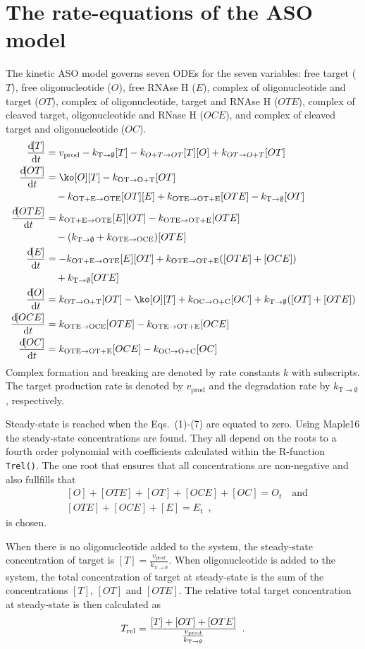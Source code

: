 \documentclass[a4paper,11pt]{article}
\newcommand{\kmo}{k_{\mathrm{OT \to O+T}}}
\newcommand{\kmt}{k_{\mathrm{OTE \to OT+E}}}
\newcommand{\kt}{k_{\mathrm{OT+E \to OTE}}}
\newcommand{\kE}{k_{\mathrm{OTE \to OCE}}}
\newcommand{\kD}{k_{\mathrm{OC \to O+C}}}
\newcommand{\vp}{v_{\mathrm{prod}}}
\newcommand{\vd}{k_{\mathrm{T \to \emptyset}}}
\newcommand{\Trel}{T_{\rm{rel}}}
\begin{document}
\section{The rate-equations of the ASO model}
The kinetic ASO model governs seven ODEs for the seven variables: free target ($T$), free oligonucleotide ($O$), free RNAse H ($E$), complex of oligonucleotide and target ($OT$), complex of oligonucleotide, target and RNAse H  ($OTE$), complex of cleaved target, oligonucleotide and RNase H ($OCE$), and complex of cleaved target and oligonucleotide  ($OC$).
\begin{align}
\frac{\dif [T]}{\dif t} &= \vp - \vd [T]-k_{O+T \to OT} [T] [O] +k_{OT\to O+T } [OT] \\
\frac{\dif [OT]}{\dif t} &= \ko[O][T]-\kmo[OT] \nonumber \\
	& \quad -\kt[OT][E]+\kmt [OTE]-\vd[OT] \\
\frac{\dif [OTE]}{\dif t} &= \kt[E][OT]-\kmt[OTE] \nonumber \\
	& \quad -(\vd+\kE)[OTE]\\
\frac{\dif [E]}{\dif t} &= -\kt[E][OT]+\kmt([OTE]+[OCE]) \nonumber \\
	& \quad+\vd[OTE]\\
\frac{\dif [O]}{\dif t}&= \kmo [OT]-\ko[O][T] +\kD [OC]+\vd([OT]+[OTE])  \\
\frac{\dif [OCE]}{\dif t}& = \kE [OTE]-\kmt [OCE]\\
\frac{\dif [OC]}{\dif t}& = \kmt [OCE]-\kD [OC]
\end{align}
Complex formation and breaking are denoted by rate constants $k$ with subscripts. The target production rate is denoted by $\vp$ and the degradation rate by $\vd$, respectively.

Steady-state is reached when the Eqs.~(1)-(7) are equated to zero. Using Maple16 the steady-state concentrations are found. They all depend on the roots to a fourth order polynomial with coefficients calculated within the R-function \texttt{Trel()}. The one root that ensures that all concentrations are non-negative and also fullfills that
\begin{align*}
 &[O]+[OTE]+[OT]+[OCE]+[OC] = O_t \quad \mathrm{and}\\ 
 &[OTE]+[OCE]+[E] = E_t \enspace,
\end{align*}
is chosen. 

When there is no oligonucleotide added to the system, the steady-state concentration of target is $[T]=\frac{\vp}{ \vd}$. When oligonucleotide is added to the system, the total concentration of target at steady-state is the sum of the concentrations $[T]$, $[OT]$ and $[OTE]$. The relative total target concentration at steady-state is then calculated as 
\begin{equation}
\Trel = \frac{[T]+[OT]+[OTE]}{\frac{\vp}{ \vd}} \enspace.
\end{equation}
\end{document}
